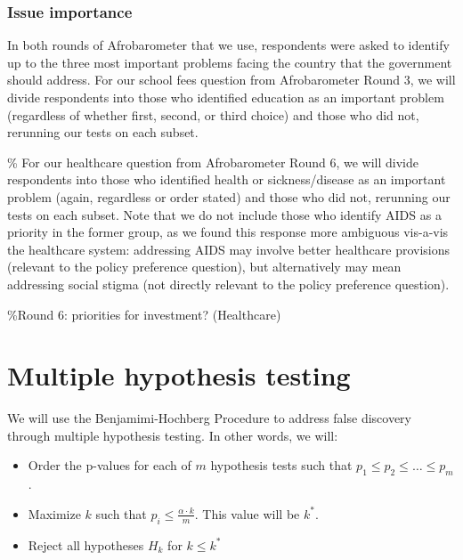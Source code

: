 \documentclass[]{article}
\begin{document}
\subsubsection{Issue importance}\label{issue-importance}

In both rounds of Afrobarometer that we use, respondents were asked to
identify up to the three most important problems facing the country that
the government should address. For our school fees question from
Afrobarometer Round 3, we will divide respondents into those who
identified education as an important problem (regardless of whether
first, second, or third choice) and those who did not, rerunning our
tests on each subset.

\% For our healthcare question from Afrobarometer Round 6, we will
divide respondents into those who identified health or sickness/disease
as an important problem (again, regardless or order stated) and those
who did not, rerunning our tests on each subset. Note that we do not
include those who identify AIDS as a priority in the former group, as we
found this response more ambiguous vis-a-vis the healthcare system:
addressing AIDS may involve better healthcare provisions (relevant to
the policy preference question), but alternatively may mean addressing
social stigma (not directly relevant to the policy preference question).

\%Round 6: priorities for investment? (Healthcare)

\section{Multiple hypothesis testing}\label{multiple-hypothesis-testing}

We will use the Benjamimi-Hochberg Procedure to address false discovery
through multiple hypothesis testing. In other words, we will:

\begin{itemize}
  \item Order the p-values for each of $m$ hypothesis tests such that $p_1 \leq p_2 \leq \ldots \leq p_m$.
  \item Maximize $k$ such that $p_i \leq \frac{\alpha \cdot k}{m}$. This value will be $k^*$.
  \item Reject all hypotheses $H_k$ for $k \leq k^*$
\end{itemize}
\end{document}
